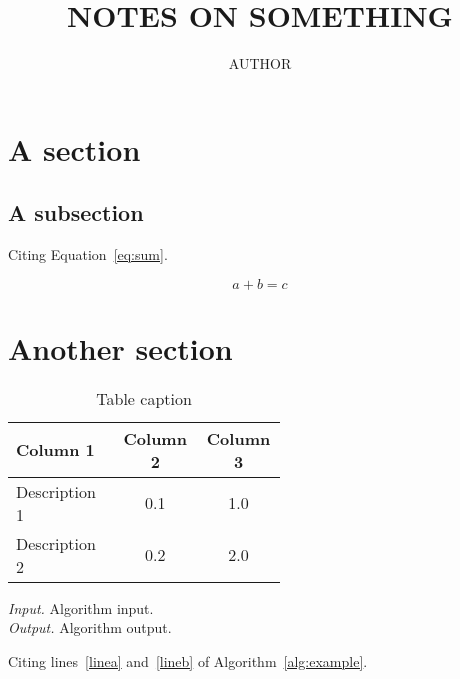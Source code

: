 \documentclass[a4paper, twocolumn, 12pt]{article}
\begin{document}
\title{NOTES ON SOMETHING}
\author{AUTHOR}
\maketitle{}

\section{A section}
\blindtext[2]{}

\subsection{A subsection}
\blindtext[2]{}

Citing Equation~\ref{eq:sum}.

\begin{equation}
\label{eq:sum}
    a + b = c
\end{equation}

\section{Another section}
\blindtext[2]{}

\begin{table}[hbt!]
  \centering
  \renewcommand{\arraystretch}{1.1}
  \caption{Table caption}
  \begin{tabular}{p{0.3\linewidth}c{0.12\linewidth}c{0.12\linewidth}}
   \toprule
   \textbf{Column 1} & \textbf{Column 2} & \textbf{Column 3} \\
   \midrule
   Description 1 & 0.1 & 1.0 \\
   Description 2 & 0.2 & 2.0 \\
  \bottomrule
  \end{tabular}\label{tab:table}
  \renewcommand{\arraystretch}{1}
\end{table}

\begin{algorithm}[hbt!]
\caption{$\textrm{AlgorithmTitle}(q, P)$}
\textit{Input.} Algorithm input. \\
\textit{Output.} Algorithm output.
\begin{algorithmic}[1]
  \label{linea}
    \Else{}
    \EndIf{}
      \label{lineb}
      \EndIf{}
    \EndFor{}
\end{algorithmic}\label{alg:example}
\end{algorithm}

Citing lines~\ref{linea} and~\ref{lineb} of Algorithm~\ref{alg:example}.
\end{document}
